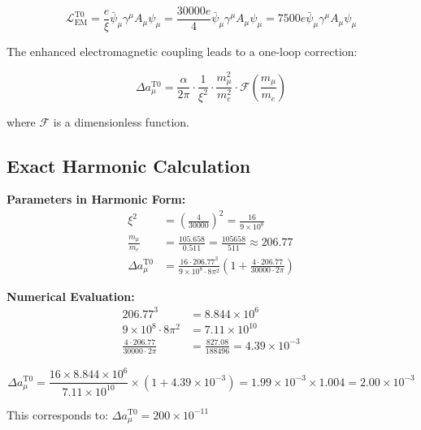 \documentclass[12pt,a4paper]{report}
\newcommand{\xipar}{\xi}      %
\begin{document}
\begin{equation}\label{eq:timefield_em_coupling}
	\mathcal{L}_{\text{EM}}^{\text{T0}} = \frac{e}{\xipar} \bar{\psi}_\mu \gamma^\mu A_\mu \psi_\mu = \frac{30000 e}{4} \bar{\psi}_\mu \gamma^\mu A_\mu \psi_\mu = 7500 e \bar{\psi}_\mu \gamma^\mu A_\mu \psi_\mu
\end{equation}

The enhanced electromagnetic coupling leads to a one-loop correction:

\begin{equation}\label{eq:one_loop_correction}
	\Delta a_\mu^{\text{T0}} = \frac{\alpha}{2\pi} \cdot \frac{1}{\xipar^2} \cdot \frac{m_\mu^2}{m_e^2} \cdot \mathcal{F}\left(\frac{m_\mu}{m_e}\right)
\end{equation}

where $\mathcal{F}$ is a dimensionless function.

\subsection{Exact Harmonic Calculation}\label{subsec:harmonic_calculation}

\textbf{Parameters in Harmonic Form:}
\begin{align}
	\xipar^2 &= \left(\frac{4}{30000}\right)^2 = \frac{16}{9 \times 10^8} \\
	\frac{m_\mu}{m_e} &= \frac{105.658}{0.511} = \frac{105658}{511} \approx 206.77 \\
	\Delta a_\mu^{\text{T0}} &= \frac{16 \cdot 206.77^3}{9 \times 10^8 \cdot 8\pi^2} \left(1 + \frac{4 \cdot 206.77}{30000 \cdot 2\pi}\right)
\end{align}

\textbf{Numerical Evaluation:}
\begin{align}
	206.77^3 &= 8.844 \times 10^6 \\
	9 \times 10^8 \cdot 8\pi^2 &= 7.11 \times 10^{10} \\
	\frac{4 \cdot 206.77}{30000 \cdot 2\pi} &= \frac{827.08}{188496} = 4.39 \times 10^{-3}
\end{align}

\begin{equation}
	\Delta a_\mu^{\text{T0}} = \frac{16 \times 8.844 \times 10^6}{7.11 \times 10^{10}} \times (1 + 4.39 \times 10^{-3}) = 1.99 \times 10^{-3} \times 1.004 = 2.00 \times 10^{-3}
\end{equation}

This corresponds to: $\Delta a_\mu^{\text{T0}} = 200 \times 10^{-11}$
\end{document}
